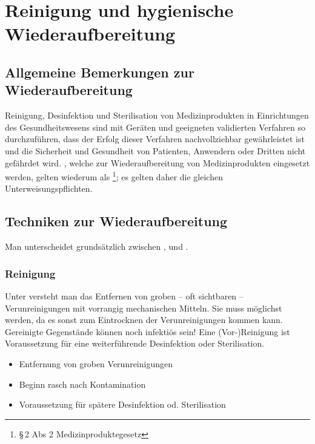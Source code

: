 
\clearpage
\section{Reinigung und hygienische Wiederaufbereitung}



\subsection{Allgemeine Bemerkungen zur Wiederaufbereitung}

Reinigung, Desinfektion und Sterilisation von
Medizinprodukten in Einrichtungen des Gesundheitswesens sind
mit Geräten und geeigneten validierten Verfahren so
durchzuführen, dass der Erfolg dieser Verfahren
nachvollziehbar gewährleistet ist und die Sicherheit und
Gesundheit von Patienten, Anwendern oder Dritten nicht
gefährdet wird. , welche zur
Wiederaufbereitung von Medizinprodukten eingesetzt werden,
gelten wiederum als \footnote{{\S}\,2 Abs
2 Medizinproduktegesetz}; es gelten daher die gleichen
Unterweisungspflichten.


\subsection{Techniken zur Wiederaufbereitung}

Man unterscheidet grundsätzlich zwischen ,  und 
.

\subsubsection{Reinigung}

{%
Unter  versteht man das Entfernen von groben --
oft sichtbaren -- Verunreinigungen mit vorrangig
mechanischen Mitteln. Sie muss möglichst  werden, da es sonst zum Eintrocknen
der Verunreinigungen kommen kann. Gereinigte Gegenstände
können noch infektiös sein!
Eine (Vor-)Reinigung ist Voraussetzung für eine
weiterführende Desinfektion oder Sterilisation.
}{
\begin{itemize}
  \item Entfernung von groben Verunreinigungen
  \item Beginn rasch nach Kontamination
  \item Voraussetzung für spätere Desinfektion od.
  Sterilisation
\end{itemize}
}{}{}{}



